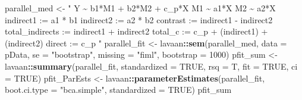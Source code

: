 \documentclass[
  11pt,
]{book}
\newenvironment{Shaded}{\begin{snugshade}}{\end{snugshade}}
\newcommand{\AttributeTok}[1]{\textcolor[rgb]{0.27,0.27,0.27}{#1}}
\newcommand{\ConstantTok}[1]{\textcolor[rgb]{0.37,0.37,0.37}{#1}}
\newcommand{\DecValTok}[1]{\textcolor[rgb]{0.06,0.06,0.06}{#1}}
\newcommand{\FunctionTok}[1]{\textcolor[rgb]{0.27,0.27,0.27}{\textbf{#1}}}
\newcommand{\NormalTok}[1]{#1}
\newcommand{\OtherTok}[1]{\textcolor[rgb]{0.37,0.37,0.37}{#1}}
\newcommand{\SpecialCharTok}[1]{\textcolor[rgb]{0.43,0.43,0.43}{\textbf{#1}}}
\newcommand{\StringTok}[1]{\textcolor[rgb]{0.5,0.5,0.5}{#1}}
\begin{document}
\begin{Shaded}
\begin{Highlighting}[]
\NormalTok{parallel\_med }\OtherTok{\textless{}{-}} \StringTok{"}
\StringTok{    Y \textasciitilde{} b1*M1 + b2*M2 + c\_p*X}
\StringTok{    M1 \textasciitilde{} a1*X}
\StringTok{    M2 \textasciitilde{} a2*X}
\StringTok{    indirect1 := a1 * b1}
\StringTok{    indirect2 := a2 * b2}
\StringTok{    contrast := indirect1 {-} indirect2}
\StringTok{    total\_indirects := indirect1 + indirect2}
\StringTok{    total\_c    := c\_p + (indirect1) + (indirect2)}
\StringTok{    direct := c\_p}
\StringTok{ "}
\NormalTok{parallel\_fit }\OtherTok{\textless{}{-}}\NormalTok{ lavaan}\SpecialCharTok{::}\FunctionTok{sem}\NormalTok{(parallel\_med, }\AttributeTok{data =}\NormalTok{ pData, }\AttributeTok{se =} \StringTok{"bootstrap"}\NormalTok{,}
    \AttributeTok{missing =} \StringTok{"fiml"}\NormalTok{, }\AttributeTok{bootstrap =} \DecValTok{1000}\NormalTok{)}
\NormalTok{pfit\_sum }\OtherTok{\textless{}{-}}\NormalTok{ lavaan}\SpecialCharTok{::}\FunctionTok{summary}\NormalTok{(parallel\_fit, }\AttributeTok{standardized =} \ConstantTok{TRUE}\NormalTok{, }\AttributeTok{rsq =}\NormalTok{ T,}
    \AttributeTok{fit =} \ConstantTok{TRUE}\NormalTok{, }\AttributeTok{ci =} \ConstantTok{TRUE}\NormalTok{)}
\NormalTok{pfit\_ParEsts }\OtherTok{\textless{}{-}}\NormalTok{ lavaan}\SpecialCharTok{::}\FunctionTok{parameterEstimates}\NormalTok{(parallel\_fit, }\AttributeTok{boot.ci.type =} \StringTok{"bca.simple"}\NormalTok{,}
    \AttributeTok{standardized =} \ConstantTok{TRUE}\NormalTok{)}
\NormalTok{pfit\_sum}
\end{Highlighting}
\end{Shaded}
\end{document}
